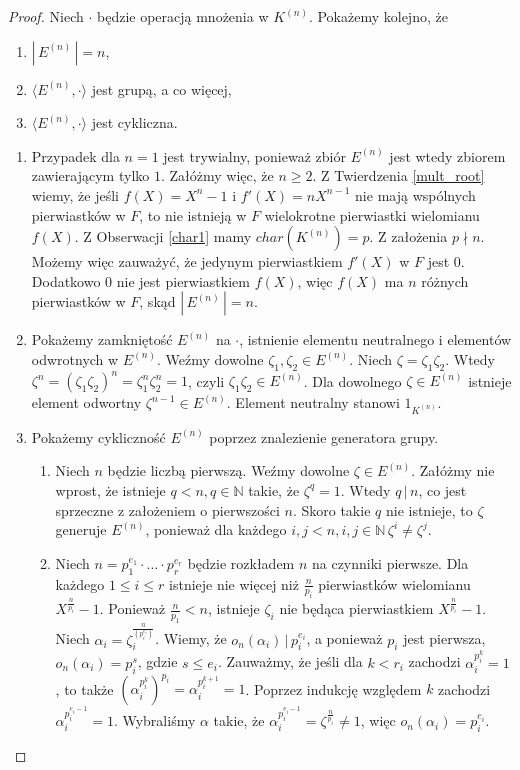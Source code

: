 \documentclass[declaration,shortabstract]{iithesis}
\theoremstyle{definition}
\theoremstyle{remark} \newtheorem{observation}{Obserwacja}
\theoremstyle{plain} \newtheorem{theorem}{Twierdzenie}
\theoremstyle{plain} \newtheorem{lemma}{Lemat}
\theoremstyle{remark} \newtheorem*{remark*}{Uwaga}
\theoremstyle{reminder} \newtheorem*{reminder*}{Przypomnienie}
\begin{document}
\begin{proof}
    Niech $\cdot$ będzie operacją mnożenia w $K^{(n)}$.
	Pokażemy kolejno, że 
	\begin{enumerate}[label=\arabic*.,leftmargin=.4in]
		\item $|\,E^{(n)}\,| = n$, 
		\item $\langle E^{(n)}, \cdot \rangle$ jest grupą, a co więcej, 
		\item $\langle E^{(n)}, \cdot \rangle$ jest cykliczna.
	\end{enumerate}
	\begin{enumerate}[label=Ad.\arabic*.,leftmargin=.4in]
		\item Przypadek dla $n = 1$ jest trywialny, ponieważ zbiór $E^{(n)}$ jest wtedy zbiorem zawierającym tylko $1$. Załóżmy więc, że $n \geq 2$. Z Twierdzenia \ref{mult_root} wiemy, że jeśli $f(X) = X^n - 1$ i $f'(X) = nX^{n-1}$ nie mają wspólnych pierwiastków w $F$, to nie istnieją w $F$ wielokrotne pierwiastki wielomianu $f(X)$. Z Obserwacji \ref{char1} mamy $char(K^{(n)}) = p$. Z założenia $p \nmid n$. Możemy więc zauważyć, że jedynym pierwiastkiem $f'(X)$ w $F$ jest $0$. Dodatkowo $0$ nie jest pierwiastkiem $f(X)$, więc $f(X)$ ma $n$ różnych pierwiastków w $F$, skąd $|\,E^{(n)}\,| = n$.
		\item Pokażemy zamkniętość $E^{(n)}$ na $\cdot$, istnienie elementu neutralnego i elementów odwrotnych w $E^{(n)}$. Weźmy dowolne $\zeta_1, \zeta_2 \in E^{(n)}$. Niech $\zeta = \zeta_1 \zeta_2$. Wtedy $\zeta^n = (\zeta_1 \zeta_2)^n = \zeta_1^n \zeta_2^n = 1$, czyli $\zeta_1 \zeta_2 \in E^{(n)}$. Dla dowolnego $\zeta \in E^{(n)}$ istnieje element odwortny $\zeta^{n-1} \in E^{(n)}$. Element neutralny stanowi $1_{K^{(n)}}$.
		\item Pokażemy cykliczność $E^{(n)}$ poprzez znalezienie generatora grupy. 
		      \begin{enumerate}[label=Ad.3.\arabic*.]
		      	\item Niech $n$ będzie liczbą pierwszą. Weźmy dowolne $\zeta \in E^{(n)}$. Załóżmy nie wprost, że istnieje $q < n, q \in \mathbb{N}$ takie, że $\zeta^q = 1$. Wtedy $q \, | \, n$, co jest sprzeczne z założeniem o pierwszości $n$. Skoro takie $q$ nie istnieje, to $\zeta$ generuje $E^{(n)}$, ponieważ dla każdego $i, j < n, i, j \in \mathbb{N} \, \zeta^i \neq \zeta^j$.
		      	\item Niech $n = p_1^{e_1} \cdot \ldots \cdot p_r^{e_r}$ będzie rozkładem $n$ na czynniki pierwsze. Dla każdego $1 \leq i \leq r$ istnieje nie więcej niż $\frac{n}{p_i}$ pierwiastków wielomianu $X^{\frac{n}{p_i}}-1$. Ponieważ $\frac{n}{p_1} < n$, istnieje $\zeta_i$ nie będąca pierwiastkiem $X^{\frac{n}{p_i}} - 1$. Niech $\alpha_i = \zeta_i^{\frac{n}{(p_i^{e_i})}}$. Wiemy, że $o_n(\alpha_i) \, | \, p_i^{e_i}$, a ponieważ $p_i$ jest pierwsza, $o_n(\alpha_i) = p_i^s$, gdzie $s \leq e_i$. Zauważmy, że jeśli dla $k < r_i$ zachodzi $\alpha_i^{p_i^k} = 1$, to także $(\alpha_i^{p_i^k})^{p_i} = \alpha_i^{p_i^{k+1}} = 1$. Poprzez indukcję względem $k$ zachodzi $\alpha_i^{p_i^{e_i-1}} = 1$. Wybraliśmy $\alpha$ takie, że $\alpha_i^{p_i^{e_i-1}} = \zeta^{\frac{n}{p_i}} \neq 1$, więc $o_n(\alpha_i) = p_i^{e_i}$. \newline

\end{enumerate}
\end{enumerate}
\end{proof}
\end{document}
